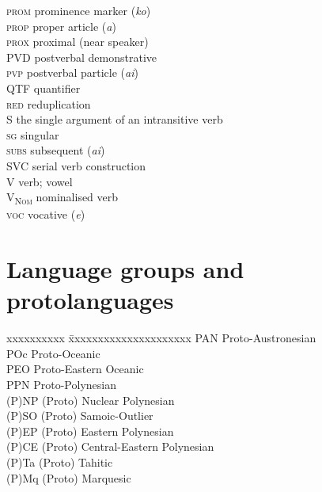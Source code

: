 \begin{tabbing}
{\scshape prom} \> prominence marker (\textit{ko})\\
{\scshape prop} \> {proper article (\textit{a})}\\
{\scshape prox} \> proximal (near speaker)\\
PVD  \> {postverbal demonstrative}\\
{\scshape pvp} \> postverbal particle (\textit{ai})\\
QTF \> quantifier\\
{\scshape red} \> reduplication\\
S \> the single argument of an intransitive verb\\
{\scshape sg} \> singular\\
{\scshape subs} \> subsequent (\textit{{\ꞌ}ai})\\
SVC \> serial verb construction\\
{\scshape V} \> verb; vowel\\
{\scshape V\textsubscript{Nom}} \> {nominalised verb}\\
{\scshape voc} \> {vocative (\textit{e})}\\
\end{tabbing} 
\section*{Language groups and protolanguages}

\begin{tabbing}
xxxxxxxxxx \= xxxxxxxxxxxxxxxxxxxxx \kill
PAN \> Proto-Austronesian\\
POc \> Proto-Oceanic\\
PEO \> Proto-Eastern Oceanic\\
PPN \> Proto-Polynesian\\
(P)NP \> (Proto) Nuclear Polynesian\\
(P)SO \> (Proto) Samoic-Outlier\\
(P)EP \> (Proto) Eastern Polynesian\\
(P)CE \> (Proto) Central-Eastern Polynesian\\
(P)Ta \> (Proto) Tahitic\\
(P)Mq \> (Proto) Marquesic\\
\end{tabbing}
